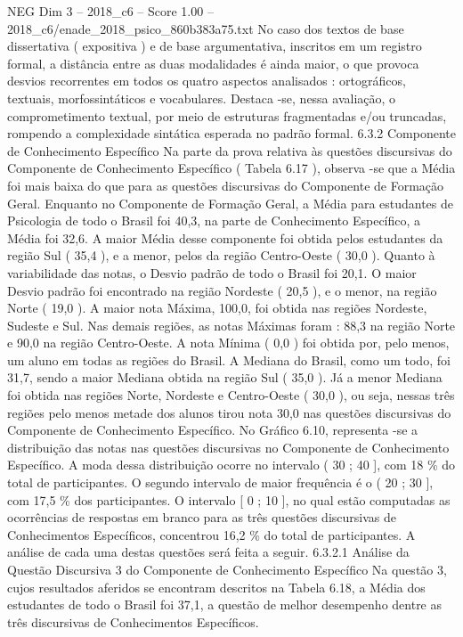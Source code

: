 \begin{textsample}{NEG Dim 3 – 2018\_c6 – Score 1.00 – 2018\_c6/enade\_2018\_psico\_860b383a75.txt}
No caso dos textos de base dissertativa ( expositiva ) e de base argumentativa, inscritos em um registro formal, a distância entre as duas modalidades é ainda maior, o que provoca desvios recorrentes em todos os quatro aspectos analisados : ortográficos, textuais, morfossintáticos e vocabulares.
Destaca -se, nessa avaliação, o comprometimento textual, por meio de estruturas fragmentadas e/ou truncadas, rompendo a complexidade sintática esperada no padrão formal. 6.3.2 Componente de Conhecimento Específico Na parte da prova relativa às questões discursivas do Componente de Conhecimento Específico ( Tabela 6.17 ), observa -se que a Média foi mais baixa do que para as questões discursivas do Componente de Formação Geral.
Enquanto no Componente de Formação Geral, a Média para estudantes de Psicologia de todo o Brasil foi 40,3, na parte de Conhecimento Específico, a Média foi 32,6.
A maior Média desse componente foi obtida pelos estudantes da região Sul ( 35,4 ), e a menor, pelos da região Centro-Oeste ( 30,0 ).
Quanto à variabilidade das notas, o Desvio padrão de todo o Brasil foi 20,1.
O maior Desvio padrão foi encontrado na região Nordeste ( 20,5 ), e o menor, na região Norte ( 19,0 ).
A maior nota Máxima, 100,0, foi obtida nas regiões Nordeste, Sudeste e Sul.
Nas demais regiões, as notas Máximas foram : 88,3 na região Norte e 90,0 na região Centro-Oeste.
A nota Mínima ( 0,0 ) foi obtida por, pelo menos, um aluno em todas as regiões do Brasil.
A Mediana do Brasil, como um todo, foi 31,7, sendo a maior Mediana obtida na região Sul ( 35,0 ).
Já a menor Mediana foi obtida nas regiões Norte, Nordeste e Centro-Oeste ( 30,0 ), ou seja, nessas três regiões pelo menos metade dos alunos tirou nota 30,0 nas questões discursivas do Componente de Conhecimento Específico.
No Gráfico 6.10, representa -se a distribuição das notas nas questões discursivas no Componente de Conhecimento Específico.
A moda dessa distribuição ocorre no intervalo ( 30 ; 40 ], com 18 \% do total de participantes.
O segundo intervalo de maior frequência é o ( 20 ; 30 ], com 17,5 \% dos participantes.
O intervalo [ 0 ; 10 ], no qual estão computadas as ocorrências de respostas em branco para as três questões discursivas de Conhecimentos Específicos, concentrou 16,2 \% do total de participantes.
A análise de cada uma destas questões será feita a seguir. 6.3.2.1 Análise da Questão Discursiva 3 do Componente de Conhecimento Específico Na questão 3, cujos resultados aferidos se encontram descritos na Tabela 6.18, a Média dos estudantes de todo o Brasil foi 37,1, a questão de melhor desempenho dentre as três discursivas de Conhecimentos Específicos.

\end{textsample}
